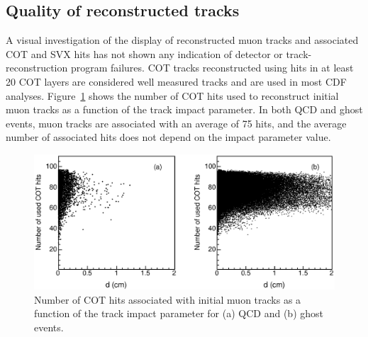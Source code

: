 \documentclass[aps,prd,preprint,floatfix,nofootinbib,superscriptaddress,showpacs,amssymb]{revtex4}
\begin{document}
\subsection{Quality of reconstructed tracks}
 A visual investigation of the display of reconstructed muon tracks and  
 associated COT and SVX hits has not shown any indication of detector or
 track-reconstruction program failures. COT tracks reconstructed using 
 hits in at least 20 COT layers are considered well measured tracks and 
 are used in most CDF analyses. Figure~\ref{fig:fig_nip} shows the number
 of COT hits used to reconstruct initial muon tracks as a function of
 the track impact parameter. In both QCD and ghost events, muon tracks
 are associated with an average of 75 hits, and the average number of
 associated hits does not depend on the impact parameter value.
 \begin{figure}
 \begin{center}
 \vspace{-0.3in}
 \leavevmode
 \includegraphics*[width=\textwidth]{fa0_cotip.eps}
 \caption[]{Number of COT hits associated with initial muon tracks
            as a function of the track impact parameter for (a) QCD
            and (b) ghost events.} 
 \label{fig:fig_nip}
 \end{center}
 \end{figure}
\end{document}
